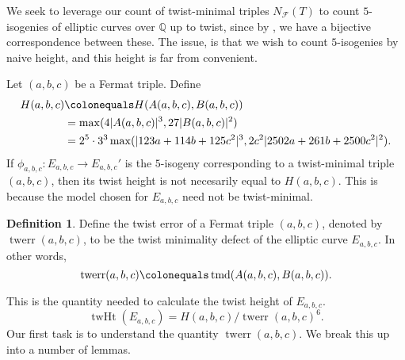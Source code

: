 \documentclass[12pt]{amsart}
\numberwithin{equation}{section} %
\theoremstyle{definition} \newtheorem{definition}[counter]{Definition}
\theoremstyle{remark} \newtheorem{nonexam}[counter]{Non-example}
\newcommand{\QQ}{\mathbb{Q}} %
\newcommand{\FF}{\mathscr{F}} %
\newcommand{\cdef}[1]{\textsf{#1}} %
\DeclareMathOperator{\twmind}{tmd} %
\DeclareMathOperator{\twht}{twHt} %
\DeclareMathOperator{\twerr}{twerr} %
\begin{document}
We seek to leverage our count of twist-minimal triples $N_\FF(T)$ to count
$5$-isogenies of elliptic curves over $\QQ$ up to twist, since by
, we have a bijective correspondence between these. The issue,
is that we wish to count $5$-isogenies by naive height, and this height is far
from convenient.

Let $(a,b,c)$ be a Fermat triple. Define
\begin{align*}
  H(a,b,c) &\colonequals H(A(a,b,c), B(a,b,c)) \\
           &= \max(4|A(a,b,c)|^3,27|B(a,b,c)|^2) \\
           &= 2^5\cdot 3^3\max(|123a + 114b + 125c^2|^3,2c^2|2502a + 261b + 2500c^2|^2). \\
\end{align*}
If $\phi_{a,b,c}\colon E_{a,b,c} \to E_{a,b,c}'$ is the $5$-isogeny
corresponding to a twist-minimal triple $(a,b,c)$, then its twist height is
not necesarily equal to $H(a,b,c)$. This is because the model chosen for
$E_{a,b,c}$ need not be twist-minimal.

\begin{definition}
  Define the \cdef{twist error} of a Fermat triple $(a,b,c)$, denoted by $\twerr(a,b,c)$, to be the twist
  minimality defect of the elliptic curve $E_{a,b,c}$. In other words,
  \begin{equation*}
    \twerr(a,b,c) \colonequals \twmind(A(a,b,c),B(a,b,c)).
  \end{equation*}
\end{definition}

This is the quantity needed to calculate the twist height of $E_{a,b,c}$.
\begin{equation}
  \label{eq:twHt-Eabc}
  \twht(E_{a,b,c}) = H(a,b,c)/\twerr(a,b,c)^6.
\end{equation}
Our first task is to understand the quantity $\twerr(a,b,c)$. We break this up
into a number of lemmas.
\end{document}
